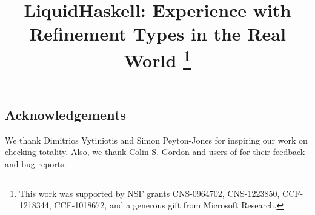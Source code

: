 \documentclass{sigplanconf}
\begin{document}

\title{LiquidHaskell: Experience with Refinement Types in the Real World 
        \thanks{This work was supported by NSF grants 
          CNS-0964702, CNS-1223850, CCF-1218344, CCF-1018672,
          and a generous gift from Microsoft Research.
        }}


\maketitle















%


\subsection*{Acknowledgements}
We thank Dimitrios Vytiniotis and Simon Peyton-Jones for inspiring 
our work on checking totality. 
Also, we thank Colin S. Gordon and users of \toolname for their feedback
and bug reports.

{


}
\end{document}
